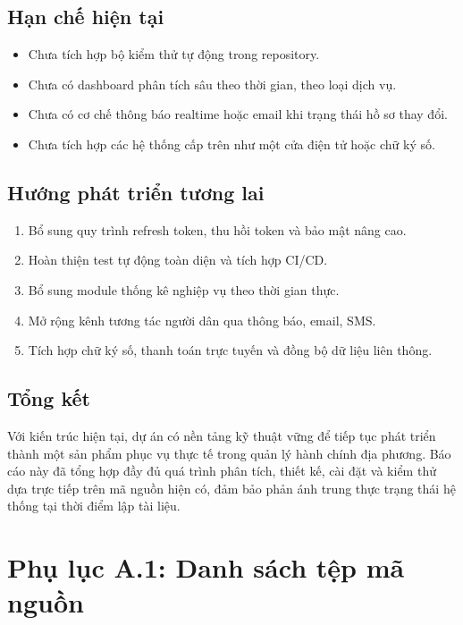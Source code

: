 \documentclass[12pt,a4paper]{article}
\begin{document}
\subsection{Hạn chế hiện tại}
\begin{itemize}[leftmargin=1.1cm]
  \item Chưa tích hợp bộ kiểm thử tự động trong repository.
  \item Chưa có dashboard phân tích sâu theo thời gian, theo loại dịch vụ.
  \item Chưa có cơ chế thông báo realtime hoặc email khi trạng thái hồ sơ thay đổi.
  \item Chưa tích hợp các hệ thống cấp trên như một cửa điện tử hoặc chữ ký số.
\end{itemize}

\subsection{Hướng phát triển tương lai}
\begin{enumerate}[leftmargin=1.1cm]
  \item Bổ sung quy trình refresh token, thu hồi token và bảo mật nâng cao.
  \item Hoàn thiện test tự động toàn diện và tích hợp CI/CD.
  \item Bổ sung module thống kê nghiệp vụ theo thời gian thực.
  \item Mở rộng kênh tương tác người dân qua thông báo, email, SMS.
  \item Tích hợp chữ ký số, thanh toán trực tuyến và đồng bộ dữ liệu liên thông.
\end{enumerate}

\subsection{Tổng kết}
Với kiến trúc hiện tại, dự án có nền tảng kỹ thuật vững để tiếp tục phát triển thành một sản phẩm phục vụ thực tế trong quản lý hành chính địa phương. Báo cáo này đã tổng hợp đầy đủ quá trình phân tích, thiết kế, cài đặt và kiểm thử dựa trực tiếp trên mã nguồn hiện có, đảm bảo phản ánh trung thực trạng thái hệ thống tại thời điểm lập tài liệu.

\newpage

\section*{Phụ lục A.1: Danh sách tệp mã nguồn}
\end{document}
